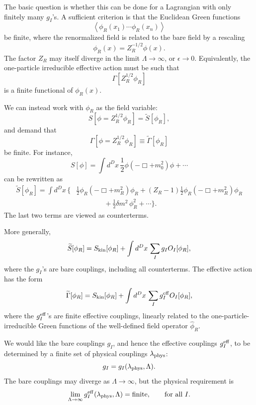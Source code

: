 The basic question is whether this can be done for a Lagrangian with only
finitely many \(g_I\)'s.  A sufficient criterion is that the Euclidean Green
functions
\[
  \left\langle
    \phi_R(x_1)\cdots \phi_R(x_n)
  \right\rangle
\]
be finite, where the renormalized field is related to the bare field by a
rescaling
\[
  \phi_R(x)=Z_R^{-1/2}\phi(x).
\]
The factor \(Z_R\) may itself diverge in the limit
\(\Lambda\to\infty\), or \(\epsilon\to 0\).  Equivalently, the one-particle
irreducible effective action must be such that
\[
  \Gamma[Z_R^{1/2}\phi_R]
\]
is a finite functional of \(\phi_R(x)\).

We can instead work with \(\phi_R\) as the field variable:
\[
  S[\phi=Z_R^{1/2}\phi_R]=\widetilde S[\phi_R],
\]
and demand that
\[
  \Gamma[\phi=Z_R^{1/2}\phi_R]\equiv
  \widetilde\Gamma[\phi_R]
\]
be finite.  For instance,
\[
  S[\phi]=\int d^D x\,
  \frac{1}{2}\phi(-\Box+m_0^2)\phi+\cdots
\]
can be rewritten as
\[
\begin{split}
  \widetilde S[\phi_R]
  =\int d^D x\,\bigg\{
  & \frac{1}{2}\phi_R(-\Box+m_R^2)\phi_R
  +(Z_R-1)\frac{1}{2}\phi_R(-\Box+m_R^2)\phi_R  \\
  &\qquad\qquad
  +\frac{1}{2}\delta m^2\,\phi_R^2+\cdots\bigg\}.
\end{split}
\]
The last two terms are viewed as counterterms.

More generally,
\[
  \widetilde S[\phi_R]
  =S_{\rm kin}[\phi_R]+\int d^D x\,\sum_I g_I O_I[\phi_R],
\]
where the \(g_I\)'s are bare couplings, including all counterterms.  The
effective action has the form
\[
  \widetilde\Gamma[\phi_R]
  =S_{\rm kin}[\phi_R]+\int d^D x\,\sum_I g_I^{\rm eff}O_I[\phi_R],
\]
where the \(g_I^{\rm eff}\)'s are finite effective couplings, linearly
related to the one-particle-irreducible Green functions of the well-defined
field operator \(\widehat\phi_R\).

We would like the bare couplings \(g_I\), and hence the effective couplings
\(g_I^{\rm eff}\), to be determined by a finite set of physical couplings
\(\lambda_{\rm phys}\):
\[
  g_I=g_I(\lambda_{\rm phys},\Lambda).
\]
The bare couplings may diverge as \(\Lambda\to\infty\), but the physical
requirement is
\[
  \lim_{\Lambda\to\infty}
  g_I^{\rm eff}(\lambda_{\rm phys},\Lambda)
  =\hbox{finite},
  \qquad\hbox{for all }I .
\]


